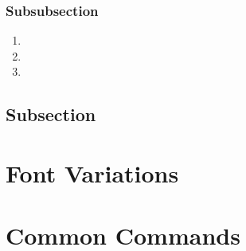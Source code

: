 \documentclass[a4paper, 11pt]{lt_article}
\begin{document}
\subsubsection{Subsubsection}
\Blindtext[1]

\begin{enumerate}
    \item \blindtext

    \item \blindtext

    \item \blindtext
\end{enumerate}

\subsection{Subsection} %

\Blindtext[2]



\newrefcontext[sorting=nyt]
\printbibliography
\newrefcontext[sorting=ynt]

\newpage
\section{Font Variations} %
\label{sec:Fonts}

\textrm{\blindtext}

\textit{\blindtext}

\textbf{\blindtext}

\textsc{\blindtext}

\newpage

\textsf{\blindtext}

\textsf{\textit{\blindtext}}

\textsf{\textbf{\blindtext}}

\texttt{\blindtext}

\newpage
\section{Common Commands} %
\label{sec:Commands}
\end{document}
